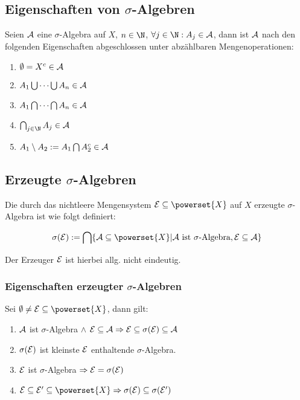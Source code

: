 \subsection*{Eigenschaften von $\sigma$-Algebren}

Seien $\mathcal{A}$ eine $\sigma$-Algebra auf $X$, $n \in \N$, $\forall j \in \N : A_j \in \A$, dann ist $\mathcal{A}$ nach den folgenden Eigenschaften abgeschlossen unter abzählbaren Mengenoperationen:

\begin{enumerate}[label=(\alph*)]
	\item $\emptyset = X^c \in \mathcal{A}$
	\item $A_1 \bigcup \cdots \bigcup A_n \in \mathcal{A}$
	\item $A_1 \bigcap \cdots \bigcap A_n \in \mathcal{A}$
	\item $\bigcap_{j\in \N} A_j \in \A$
	\item $A_1 \setminus A_2 := A_1 \bigcap A_2^c \in \mathcal{A}$
\end{enumerate}

\subsection*{Erzeugte $\sigma$-Algebren}

Die durch das nichtleere Mengensystem $\E \subseteq \powerset{X}$ auf $X$ erzeugte $\sigma$-Algebra ist wie folgt definiert:

\vspace*{-4mm}
$$\sigma(\E) := \bigcap\{ \A \subseteq \powerset{X} | \A \text{ ist } \sigma \text{-Algebra}, \E \subseteq \A \}$$

Der Erzeuger $\mathcal{E}$ ist hierbei allg. nicht eindeutig.

\subsubsection*{Eigenschaften erzeugter $\sigma$-Algebren}

Sei $\emptyset \neq \E \subseteq \powerset{X}$, dann gilt:

\begin{enumerate}[label=(\alph*)]
	\item $\mathcal{A}$ ist $\sigma$-Algebra $\land$ $\mathcal{E} \subseteq \mathcal{A} \Rightarrow \mathcal{E} \subseteq \sigma(\mathcal{E}) \subseteq \mathcal{A}$
	\item $\sigma(\mathcal{E})$ ist kleinste $\mathcal{E}$ enthaltende $\sigma$-Algebra.
	\item $\mathcal{E}$ ist $\sigma$-Algebra $\Rightarrow \mathcal{E} = \sigma(\mathcal{E})$
	\item $\E \subseteq \E' \subseteq \powerset{X} \Rightarrow \sigma(\E) \subseteq \sigma(\E')$
\end{enumerate}

